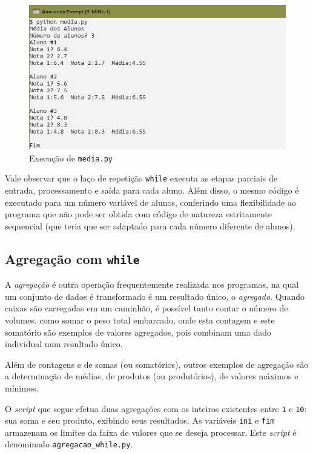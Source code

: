 \documentclass[
]{book}
\begin{document}
\begin{figure}
\centering
\includegraphics{images/05-03.jpg}
\caption{\label{fig:05-03}Execução de \texttt{media.py}}
\end{figure}

Vale observar que o laço de repetição \texttt{while} executa as etapas parciais de entrada, processamento e saída para cada aluno. Além disso, o mesmo código é executado para um número variável de alunos, conferindo uma flexibilidade ao programa que não pode ser obtida com código de natureza estritamente sequencial (que teria que ser adaptado para cada número diferente de alunos).

\hypertarget{repet-while-acumu}{%
\subsection{\texorpdfstring{Agregação com \texttt{while}}{Agregação com while}}\label{repet-while-acumu}}

A \emph{agregação} é outra operação frequentemente realizada nos programas, na qual um conjunto de dados é transformado é um resultado único, o \emph{agregado}. Quando caixas são carregadas em um caminhão, é possível tanto contar o número de volumes, como somar o peso total embarcado, onde esta contagem e este somatório são exemplos de valores agregados, pois combinam uma dado individual num resultado único.

Além de contagens e de somas (ou somatórios), outros exemplos de agregação são a determinação de médias, de produtos (ou produtórios), de valores máximos e mínimos.

O \emph{script} que segue efetua duas agregações com os inteiros existentes entre \texttt{1} e \texttt{10}: sua soma e seu produto, exibindo seus resultados. As variáveis \texttt{ini} e \texttt{fim} armazenam os limites da faixa de valores que se deseja processar. Este \emph{script} é denominado \texttt{agregacao\_while.py}.
\end{document}
